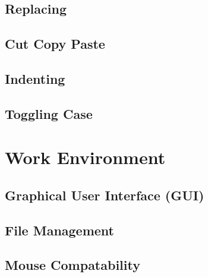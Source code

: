 \documentclass[12pt, oneside]{book}
\begin{document}
  \subsection{Replacing}
  \subsection{Cut Copy Paste}
  \subsection{Indenting}
  \subsection{Toggling Case}
\section{Work Environment}
  \subsection{Graphical User Interface (GUI)}
  \subsection{File Management}
  \subsection{Mouse Compatability}
\end{document}
